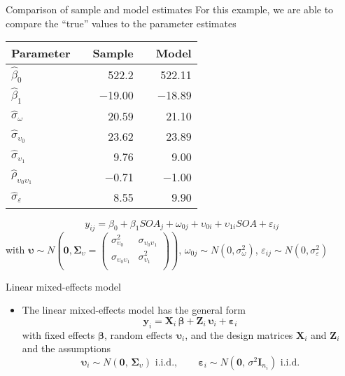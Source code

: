 \documentclass{beamer}
\newcommand{\vect}[1]{\mathbf{#1}}
\newcommand{\mat}[1]{\mathbf{#1}}
\newcommand{\gvect}[1]{\boldsymbol{#1}}
\newcommand{\gmat}[1]{\boldsymbol{#1}}
\begin{document}
\begin{frame}{Comparison of sample and model estimates}
  For this example, we are able to compare the ``true'' values to the
  parameter estimates
  \begin{center}
  \begin{tabular}{lrrrr}
    \hline
    Parameter && Sample && Model \\
    \hline
    $\hat\beta_0$ && 522.2 && 522.11\\
    $\hat\beta_1$ && $-$19.00 && $-$18.89\\
    $\hat\sigma_{\omega}$ && 20.59 && 21.10\\
    $\hat\sigma_{\upsilon_0}$ && 23.62 && 23.89\\
    $\hat\sigma_{\upsilon_1}$ && 9.76 && 9.00\\
    $\hat\rho_{\upsilon_0\upsilon_1}$ && $-$0.71 && $-$1.00\\
    $\hat\sigma_{\varepsilon}$ && 8.55 && 9.90\\
    \hline
  \end{tabular}
  \end{center}
     \[
       y_{ij} = \beta_0 + \beta_1 SOA_j + \omega_{0j} + \upsilon_{0i} +
       \upsilon_{1i} SOA + \varepsilon_{ij} 
  \]
\small
with $\gvect{\upsilon} \sim N\left(\gvect{0}, \gmat{\Sigma}_{\upsilon} = 
    \begin{pmatrix}
      \sigma^2_{\upsilon_0} & \sigma_{\upsilon_0\upsilon_1} \\
      \sigma_{\upsilon_0\upsilon_1} & \sigma^2_{\upsilon_1} \\
    \end{pmatrix}\right)$,
  $\omega_{0j} \sim N(0, \sigma_{\omega}^2)$, $\varepsilon_{ij} \sim N(0,
  \sigma_{\varepsilon}^2)$ 
\end{frame}


\begin{frame}{Linear mixed-effects model}
  \begin{itemize}
    \item The linear mixed-effects model has the general form
\[
  \vect{y}_i = \mat{X}_i \, \gvect{\beta} + \mat{Z}_i \, \gvect{\upsilon}_i +
               \gvect{\varepsilon}_i
\]
with fixed effects $\gvect{\beta}$, random effects
$\gvect{\upsilon}_i$, and the design matrices $\mat{X}_i$ and $\mat{Z}_i$
  and the assumptions
\[
  \gvect{\upsilon}_i \sim N(\vect{0}, \, \gmat{\Sigma}_\upsilon)
    \text{ i.i.d.}, \qquad
  \gvect{\varepsilon}_i \sim N(\vect{0}, \, \sigma^2 \mat{I}_{n_i})
    \text{ i.i.d.}
\]
  \end{itemize}
\end{frame}
\end{document}
